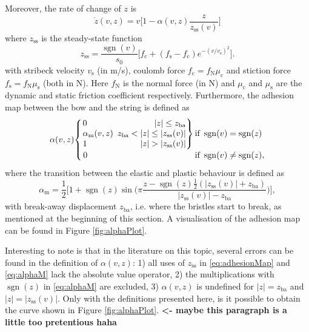 \documentclass[twoside,a4paper]{article}
\newenvironment{rcases}
  {\left.\begin{alignedat}{2}}
  {\end{alignedat}\right\rbrace}
\DeclareMathOperator{\sgn}{sgn}
\begin{document}
Moreover, the rate of change of $z$ is
\begin{equation}\label{eq:zdot}
    \dot z(v, z) = v\bigg[1-\alpha(v, z)\frac{z}{z_\text{ss}(v)}\bigg]
\end{equation}
where $z_\text{ss}$ is the steady-state function
\begin{equation}
    z_\text{ss} = \frac{\sgn(v)}{s_0}\Big[f_\text{c}+(f_\text{s}-f_\text{c})e^{-(v/v_\text{s})^2}\Big].
\end{equation}
with stribeck velocity $v_\text{s}$ (in m/s), coulomb force $f_\text{c} = f_\text{N}\mu_\text{c}$ and stiction force $f_\text{s} = f_\text{N}\mu_\text{s}$ (both in N). Here $f_\text{N}$ is the normal force (in N) and $\mu_\text{c}$ and $\mu_\text{s}$ are the dynamic and static friction coefficient respectively. 
Furthermore, the adhesion map between the bow and the string is defined as
\begin{equation}\label{eq:adhesionMap}
\alpha(v, z) 
\begin{aligned}
    \begin{cases}
    \begin{rcases}
        &0 & |z| \leq z_\text{ba}\\
       &\alpha_\text{m}(v,z)&\ \, z_\text{ba}<|z|\leq|z_\text{ss}(v)|\\        &1 &|z|>|z_\text{ss}(v)|
        \end{rcases} 
        
        &\!\!\!\!\!\text{if}\  \sgn(v)=\sgn(z)\\
        \,0&\!\!\!\!\!\text{if}\  \sgn(v)\neq\sgn(z),
    \end{cases}
    \end{aligned}
\end{equation}
where the transition between the elastic and plastic behaviour is defined as
\begin{equation}\label{eq:alphaM}
    \alpha_\text{m} = \frac{1}{2}\bigg[1+\sgn(z)\sin\bigg(\pi\frac{z-\sgn(z)\frac{1}{2}(|z_\text{ss}(v)|+z_\text{ba})}{|z_\text{ss}(v)|-z_\text{ba}}\bigg)\bigg],
\end{equation}
with break-away displacement $z_\text{ba}$, i.e. where the bristles start to break, as mentioned at the beginning of this section. A visualisation of the adhesion map can be found in Figure \ref{fig:alphaPlot}. 

Interesting to note is that in the literature on this topic, several errors can be found in the definition of $\alpha(v,z)$: 1) all uses of $z_\text{ss}$ in \eqref{eq:adhesionMap} and \eqref{eq:alphaM} lack the absolute value operator, 2) the multiplications with $\sgn(z)$ in \eqref{eq:alphaM} are excluded, 3) $\alpha(v,z)$ is undefined for $|z|=z_\text{ba}$ and $|z|=|z_\text{ss}(v)|$. Only with the definitions presented here, is it possible to obtain the curve shown in Figure \ref{fig:alphaPlot}. \textbf{<- maybe this paragraph is a little too pretentious haha}
\end{document}

